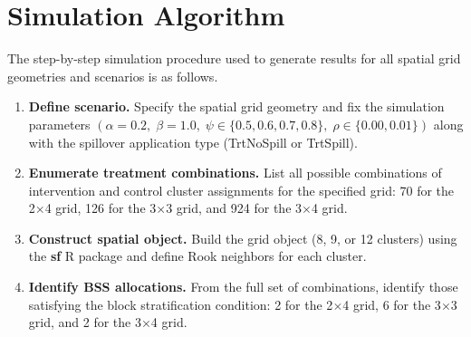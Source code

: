 \documentclass{article}[11pt]
\begin{document}
\section{Simulation Algorithm}\label{appendix:SimAlgorithm}

The step-by-step simulation procedure used to generate results for all spatial grid geometries and scenarios is as follows.

\begin{enumerate}
    \item\label{AppStep:Define} \textbf{Define scenario.} Specify the spatial grid geometry and fix the simulation parameters $(\alpha = 0.2,\; \beta = 1.0,\; \psi \in \{0.5, 0.6, 0.7, 0.8\},\; \rho \in \{0.00, 0.01\})$ along with the spillover application type (TrtNoSpill or TrtSpill).

    \item \textbf{Enumerate treatment combinations.} List all possible combinations of intervention and control cluster assignments for the specified grid: 70 for the 2$\times$4 grid, 126 for the 3$\times$3 grid, and 924 for the 3$\times$4 grid.

    \item \textbf{Construct spatial object.} Build the grid object (8, 9, or 12 clusters) using the \textbf{sf} R package\cite{pebesma_simple_2018} and define Rook neighbors for each cluster.

    \item \textbf{Identify BSS allocations.} From the full set of combinations, identify those satisfying the block stratification condition: 2 for the 2$\times$4 grid, 6 for the 3$\times$3 grid, and 2 for the 3$\times$4 grid.


\end{enumerate}
\end{document}
